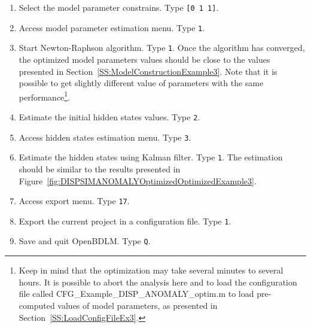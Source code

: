 \begin{enumerate}
\item Select the model parameter constrains. Type \colorbox{light-gray}{\lstinline[basicstyle = \mlttfamily \small, backgroundcolor = \color{light-gray}]![0 1 1]!}.
\item Access model parameter estimation menu. Type \colorbox{light-gray}{\lstinline[basicstyle = \mlttfamily \small, backgroundcolor = \color{light-gray}]!1!}. 
\item Start Newton-Raphson algorithm. Type \colorbox{light-gray}{\lstinline[basicstyle = \mlttfamily \small, backgroundcolor = \color{light-gray}]!1!}. Once the algorithm has converged, the optimized model parameters values should be close to the values presented in Section~\ref{SS:ModelConstructionExample3}. Note that it is possible to get slightly different value of parameters with the same performance\footnote{Keep in mind that the optimization may take several minutes to several hours. It is possible to abort the analysis here and to load the configuration file called CFG\_Example\_DISP\_ANOMALY\_optim.m to load pre-computed values of model parameters, as presented in Section~\ref{SS:LoadConfigFileEx3}.}.
\item Estimate the initial hidden states values. Type \colorbox{light-gray}{\lstinline[basicstyle = \mlttfamily \small, backgroundcolor = \color{light-gray}]!2!}.
\item Access hidden states estimation menu. Type \colorbox{light-gray}{\lstinline[basicstyle = \mlttfamily \small, backgroundcolor = \color{light-gray}]!3!}. 
\item Estimate the hidden states using Kalman filter. Type \colorbox{light-gray}{\lstinline[basicstyle = \mlttfamily \small, backgroundcolor = \color{light-gray}]!1!}. The estimation should be similar to the results presented in Figure~\ref{fig:DISPSIMANOMALYOptimizedOptimizedExample3}.
\item Access export menu. Type \colorbox{light-gray}{\lstinline[basicstyle = \mlttfamily \small, backgroundcolor = \color{light-gray}]!17!}. 
\item Export the current project in a configuration file. Type \colorbox{light-gray}{\lstinline[basicstyle = \mlttfamily \small, backgroundcolor = \color{light-gray}]!1!}.
\item Save and quit OpenBDLM. Type \colorbox{light-gray}{\lstinline[basicstyle = \mlttfamily \small, backgroundcolor = \color{light-gray}]!Q!}.
\end{enumerate}


